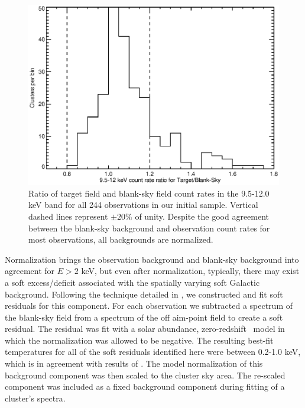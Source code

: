 \begin{figure}
\begin{center}
\includegraphics*[width=\textwidth, trim=5mm 0mm 0mm 0mm,clip]{eband_f2.eps}
\caption[Histogram of hard-particle count rate ratios for $T_{HBR}$
  sample] {Ratio of target field and blank-sky field count rates in
  the 9.5-12.0 keV band for all 244 observations in our initial
  sample. Vertical dashed lines represent $\pm 20\%$ of unity. Despite
  the good agreement between the blank-sky background and observation
  count rates for most observations, all backgrounds are normalized.}
\label{fig:bgd}
\end{center}
\end{figure}

Normalization brings the observation background and blank-sky
background into agreement for $E > 2$ keV, but even after
normalization, typically, there may exist a soft excess/deficit
associated with the spatially varying soft Galactic
background. Following the technique detailed in
\citet{2005ApJ...628..655V}, we constructed and fit soft residuals for
this component. For each observation we subtracted a spectrum of the
blank-sky field from a spectrum of the off aim-point field to create a
soft residual. The residual was fit with a solar abundance,
zero-redshift \mekal\ model \citep{mekal1, mekal2, mekal3} in which
the normalization was allowed to be negative. The resulting best-fit
temperatures for all of the soft residuals identified here were
between 0.2-1.0 keV, which is in agreement with results of
\citet{2005ApJ...628..655V}. The model normalization of this background
component was then scaled to the cluster sky area. The re-scaled
component was included as a fixed background component during fitting
of a cluster's spectra.

